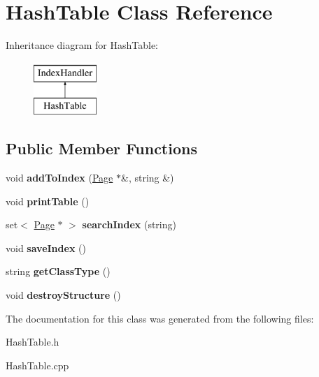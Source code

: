 \hypertarget{class_hash_table}{\section{Hash\+Table Class Reference}
\label{class_hash_table}
}
Inheritance diagram for Hash\+Table\+:\begin{figure}[H]
\begin{center}
\leavevmode
\includegraphics[height=2.000000cm]{class_hash_table}
\end{center}
\end{figure}
\subsection*{Public Member Functions}
\begin{DoxyCompactItemize}
\item 
\hypertarget{class_hash_table_aaa6417f06baad4f297d098dc7393e48b}{void {\bfseries add\+To\+Index} (\hyperlink{class_page}{Page} $\ast$\&, string \&)}\label{class_hash_table_aaa6417f06baad4f297d098dc7393e48b}

\item 
\hypertarget{class_hash_table_ab50be186df67a5621694cb2f692de3fa}{void {\bfseries print\+Table} ()}\label{class_hash_table_ab50be186df67a5621694cb2f692de3fa}

\item 
\hypertarget{class_hash_table_a838109ea89fa1b80908aee6838d96ad1}{set$<$ \hyperlink{class_page}{Page} $\ast$ $>$ {\bfseries search\+Index} (string)}\label{class_hash_table_a838109ea89fa1b80908aee6838d96ad1}

\item 
\hypertarget{class_hash_table_ad42a8eb156c387de2645ca1276ea412a}{void {\bfseries save\+Index} ()}\label{class_hash_table_ad42a8eb156c387de2645ca1276ea412a}

\item 
\hypertarget{class_hash_table_ab5a5fca28242a0733cb95e0729d94761}{string {\bfseries get\+Class\+Type} ()}\label{class_hash_table_ab5a5fca28242a0733cb95e0729d94761}

\item 
\hypertarget{class_hash_table_acf96b4d4e320ab83fbeed1578a415be8}{void {\bfseries destroy\+Structure} ()}\label{class_hash_table_acf96b4d4e320ab83fbeed1578a415be8}

\end{DoxyCompactItemize}


The documentation for this class was generated from the following files\+:\begin{DoxyCompactItemize}
\item 
Hash\+Table.\+h\item 
Hash\+Table.\+cpp\end{DoxyCompactItemize}

